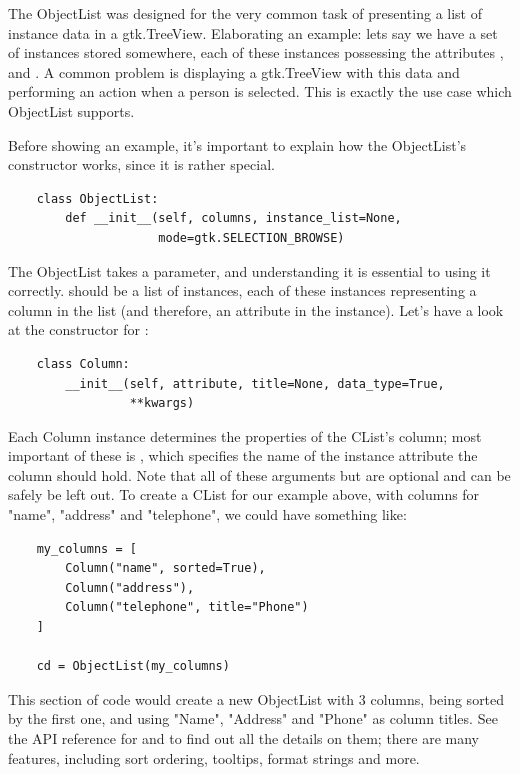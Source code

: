 \documentclass[a4paper]{howto}
\begin{document}
The ObjectList was designed for the very common task of presenting a
list of instance data in a gtk.TreeView. Elaborating an example: lets say we
have a set of  instances stored somewhere, each of these
instances possessing the attributes ,  and
. A common problem is displaying a gtk.TreeView with this data
and performing an action when a person is selected. This is exactly the
use case which ObjectList supports.

Before showing an example, it's important to explain how the
ObjectList's constructor works, since it is rather special.

    \begin{verbatim}
    class ObjectList:
        def __init__(self, columns, instance_list=None,
                     mode=gtk.SELECTION_BROWSE)
    \end{verbatim}

The ObjectList takes a  parameter, and understanding it
is essential to using it correctly.  should be a list of
 instances, each of these instances representing a column
in the list (and therefore, an attribute in the instance). Let's have a
look at the constructor for :

    \begin{verbatim}
    class Column:
        __init__(self, attribute, title=None, data_type=True,
                 **kwargs)
    \end{verbatim}

Each Column instance determines the properties of the CList's column;
most important of these is , which specifies the name of
the instance attribute the column should hold. Note that all of these
arguments but  are optional and can be safely be left
out. To create a CList for our example above, with columns for "name",
"address" and "telephone", we could have something like:

    \begin{verbatim}
    my_columns = [
        Column("name", sorted=True),
        Column("address"),
        Column("telephone", title="Phone")
    ]

    cd = ObjectList(my_columns)
    \end{verbatim}

This section of code would create a new ObjectList with 3 columns,
being sorted by the first one, and using "Name", "Address" and "Phone"
as column titles. See the API reference for  and
 to find out all the details on them; there are many
features, including sort ordering, tooltips, format strings and more.
\end{document}
